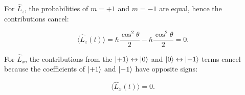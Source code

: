\documentclass[11pt,a4paper]{scrartcl}
\newcommand{\op}[1]{\hat{#1}}
\begin{document}
\begin{enumerate}[label=(\alph*)]
\begin{calculationbox}
            For $\op{L}_z$, the probabilities of $m=+1$ and $m=-1$ are equal, hence the contributions cancel:
            \begin{calculationbox}
                \[
                    \langle\op{L}_z(t)\rangle
                    =\hbar\frac{\cos^2\theta}{2}-\hbar\frac{\cos^2\theta}{2}=0.
                \]
            \end{calculationbox}

            For $\op{L}_x$, the contributions from the $\ket{+1}\leftrightarrow\ket{0}$ and $\ket{0}\leftrightarrow\ket{-1}$ terms cancel because the coefficients of $\ket{+1}$ and $\ket{-1}$ have opposite signs:
            \begin{calculationbox}
                \[
                    \langle\op{L}_x(t)\rangle=0.
                \]
            \end{calculationbox}


\end{calculationbox}
\end{enumerate}
\end{document}
